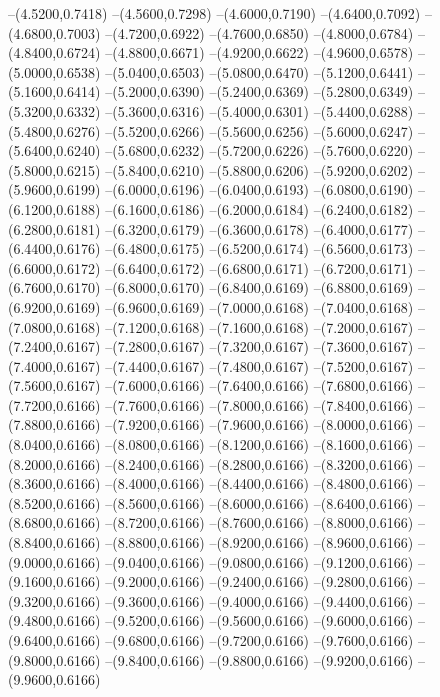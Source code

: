 {	--(4.5200,0.7418)
	--(4.5600,0.7298)
	--(4.6000,0.7190)
	--(4.6400,0.7092)
	--(4.6800,0.7003)
	--(4.7200,0.6922)
	--(4.7600,0.6850)
	--(4.8000,0.6784)
	--(4.8400,0.6724)
	--(4.8800,0.6671)
	--(4.9200,0.6622)
	--(4.9600,0.6578)
	--(5.0000,0.6538)
	--(5.0400,0.6503)
	--(5.0800,0.6470)
	--(5.1200,0.6441)
	--(5.1600,0.6414)
	--(5.2000,0.6390)
	--(5.2400,0.6369)
	--(5.2800,0.6349)
	--(5.3200,0.6332)
	--(5.3600,0.6316)
	--(5.4000,0.6301)
	--(5.4400,0.6288)
	--(5.4800,0.6276)
	--(5.5200,0.6266)
	--(5.5600,0.6256)
	--(5.6000,0.6247)
	--(5.6400,0.6240)
	--(5.6800,0.6232)
	--(5.7200,0.6226)
	--(5.7600,0.6220)
	--(5.8000,0.6215)
	--(5.8400,0.6210)
	--(5.8800,0.6206)
	--(5.9200,0.6202)
	--(5.9600,0.6199)
	--(6.0000,0.6196)
	--(6.0400,0.6193)
	--(6.0800,0.6190)
	--(6.1200,0.6188)
	--(6.1600,0.6186)
	--(6.2000,0.6184)
	--(6.2400,0.6182)
	--(6.2800,0.6181)
	--(6.3200,0.6179)
	--(6.3600,0.6178)
	--(6.4000,0.6177)
	--(6.4400,0.6176)
	--(6.4800,0.6175)
	--(6.5200,0.6174)
	--(6.5600,0.6173)
	--(6.6000,0.6172)
	--(6.6400,0.6172)
	--(6.6800,0.6171)
	--(6.7200,0.6171)
	--(6.7600,0.6170)
	--(6.8000,0.6170)
	--(6.8400,0.6169)
	--(6.8800,0.6169)
	--(6.9200,0.6169)
	--(6.9600,0.6169)
	--(7.0000,0.6168)
	--(7.0400,0.6168)
	--(7.0800,0.6168)
	--(7.1200,0.6168)
	--(7.1600,0.6168)
	--(7.2000,0.6167)
	--(7.2400,0.6167)
	--(7.2800,0.6167)
	--(7.3200,0.6167)
	--(7.3600,0.6167)
	--(7.4000,0.6167)
	--(7.4400,0.6167)
	--(7.4800,0.6167)
	--(7.5200,0.6167)
	--(7.5600,0.6167)
	--(7.6000,0.6166)
	--(7.6400,0.6166)
	--(7.6800,0.6166)
	--(7.7200,0.6166)
	--(7.7600,0.6166)
	--(7.8000,0.6166)
	--(7.8400,0.6166)
	--(7.8800,0.6166)
	--(7.9200,0.6166)
	--(7.9600,0.6166)
	--(8.0000,0.6166)
	--(8.0400,0.6166)
	--(8.0800,0.6166)
	--(8.1200,0.6166)
	--(8.1600,0.6166)
	--(8.2000,0.6166)
	--(8.2400,0.6166)
	--(8.2800,0.6166)
	--(8.3200,0.6166)
	--(8.3600,0.6166)
	--(8.4000,0.6166)
	--(8.4400,0.6166)
	--(8.4800,0.6166)
	--(8.5200,0.6166)
	--(8.5600,0.6166)
	--(8.6000,0.6166)
	--(8.6400,0.6166)
	--(8.6800,0.6166)
	--(8.7200,0.6166)
	--(8.7600,0.6166)
	--(8.8000,0.6166)
	--(8.8400,0.6166)
	--(8.8800,0.6166)
	--(8.9200,0.6166)
	--(8.9600,0.6166)
	--(9.0000,0.6166)
	--(9.0400,0.6166)
	--(9.0800,0.6166)
	--(9.1200,0.6166)
	--(9.1600,0.6166)
	--(9.2000,0.6166)
	--(9.2400,0.6166)
	--(9.2800,0.6166)
	--(9.3200,0.6166)
	--(9.3600,0.6166)
	--(9.4000,0.6166)
	--(9.4400,0.6166)
	--(9.4800,0.6166)
	--(9.5200,0.6166)
	--(9.5600,0.6166)
	--(9.6000,0.6166)
	--(9.6400,0.6166)
	--(9.6800,0.6166)
	--(9.7200,0.6166)
	--(9.7600,0.6166)
	--(9.8000,0.6166)
	--(9.8400,0.6166)
	--(9.8800,0.6166)
	--(9.9200,0.6166)
	--(9.9600,0.6166)
}
